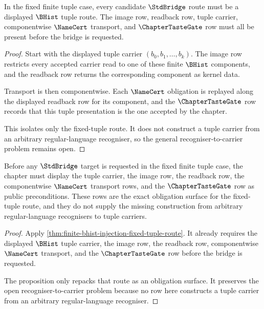 \begin{theorem}
\label{thm:finite-bhist-injection-fixed-tuple-route}
In the fixed finite tuple case, every candidate $\StdBridge$ route must be a displayed $\BHist$ tuple route. The image row, readback row, tuple carrier, componentwise $\NameCert$ transport, and $\ChapterTasteGate$ row must all be present before the bridge is requested.
\end{theorem}
\begin{proof}
Start with the displayed tuple carrier $(b_0,b_1,\ldots,b_k)$. The image row restricts every accepted carrier read to one of these finite $\BHist$ components, and the readback row returns the corresponding component as kernel data.

Transport is then componentwise. Each $\NameCert$ obligation is replayed along the displayed readback row for its component, and the $\ChapterTasteGate$ row records that this tuple presentation is the one accepted by the chapter.

This isolates only the fixed-tuple route. It does not construct a tuple carrier from an arbitrary regular-language recogniser, so the general recogniser-to-carrier problem remains open.
\end{proof}

\begin{proposition}
\label{prop:finite-bhist-injection-fixed-tuple-obligation-surface}
Before any $\StdBridge$ target is requested in the fixed finite tuple case, the chapter must display the tuple carrier, the image row, the readback row, the componentwise $\NameCert$ transport rows, and the $\ChapterTasteGate$ row as public preconditions. These rows are the exact obligation surface for the fixed-tuple route, and they do not supply the missing construction from arbitrary regular-language recognisers to tuple carriers.
\end{proposition}
\begin{proof}
Apply \autoref{thm:finite-bhist-injection-fixed-tuple-route}. It already requires the displayed $\BHist$ tuple carrier, the image row, the readback row, componentwise $\NameCert$ transport, and the $\ChapterTasteGate$ row before the bridge is requested.

The proposition only repacks that route as an obligation surface. It preserves the open recogniser-to-carrier problem because no row here constructs a tuple carrier from an arbitrary regular-language recogniser.
\end{proof}

